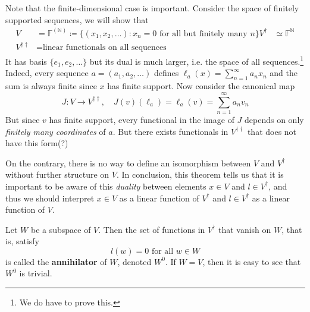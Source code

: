 	\begin{example}
	  \label{ex:infinite-dimensional-case}
	  Note that the finite-dimensional case is important. Consider the space of finitely supported sequences, we will show that
		\begin{align}
			V & = \mathbb{F}^{(\mathbb{N})} \coloneqq \{(x_1, x_2, \ldots) \colon x_n = 0 \text{ for all but finitely many } n\} 
			V^\dagger & \simeq \mathbb{F}^{\mathbb{N}} \\ 
			V^{\dagger \dagger} & = \text{linear functionals on all sequences}
		\end{align}
		It has basis $\{e_1, e_2, \ldots \}$ but its dual is much larger, i.e. the space of all sequences.\footnote{We do have to prove this.} 
		\begin{equation}
		\end{equation}
		Indeed, every sequence $a = (a_1, a_2, \ldots)$ defines $\ell_a (x) = \sum_{n=1}^\infty a_n x_n$ and the sum is always finite since $x$ has finite support. Now consider the canonical map 
		\begin{equation}
			J: V \to V^{\dagger\dagger}, \quad J(v)(\ell_a) = \ell_a (v) = \sum_{n=1}^\infty a_n v_n
		\end{equation}
		But since $v$ has finite support, every functional in the image of $J$ depends on only \textit{finitely many coordinates} of $a$. But there exists functionals in $V^{\dagger\dagger}$ that does not have this form(?)
	\end{example}

  On the contrary, there is no way to define an isomorphism between $V$ and $V^\dagger$ without further structure on $V$. In conclusion, this theorem tells us that it is important to be aware of this \textit{duality} between elements $x \in V$ and $l \in V^\dagger$, and thus we should interpret $x \in V$ as a linear function of $V^\dagger$ and $l \in V^\dagger$ as a linear function of $V$.

  \begin{definition}[Annihilator]
    \label{def:annihilator}
    Let $W$ be a subspace of $V$. Then the set of functions in $V^\dagger$ that vanish on $W$, that is, satisfy
    \begin{equation}
      l(w) = 0 \text{ for all } w \in W
    \end{equation}
    is called the \textbf{annihilator} of $W$, denoted $W^0$. If $W = V$, then it is easy to see that $W^0$ is trivial. 
  \end{definition}

